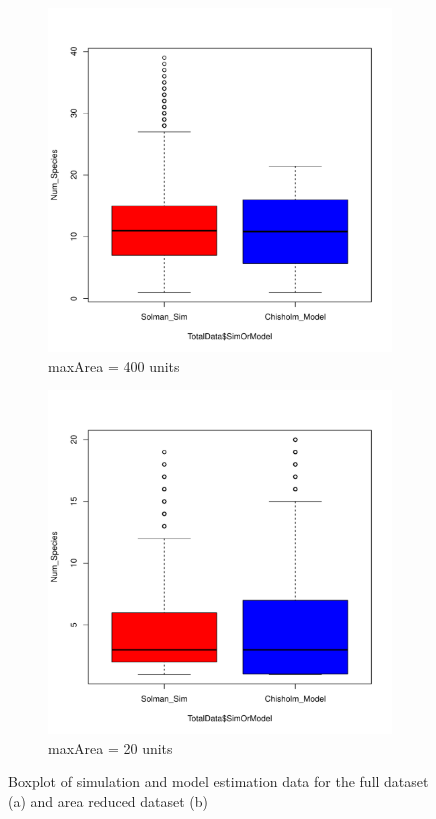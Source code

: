 \documentclass{article}
\begin{document}
\begin{figure}[h!]
  \centering
  \begin{subfigure}[b]{0.4\linewidth}
    \includegraphics[width=\linewidth]{../../Results/Simulation/SolmanChisholmBoxplot_1.pdf}
    \caption{maxArea = 400 units}
  \end{subfigure}
  \begin{subfigure}[b]{0.4\linewidth}
    \includegraphics[width=\linewidth]{../../Results/Simulation/SolmanChisholmBoxplot_20.pdf}
    \caption{maxArea = 20 units}
  \end{subfigure}
  \caption{Boxplot of simulation and model estimation data for the full dataset (a) and area reduced dataset (b)}
  \label{fig:boxplots}
\end{figure}
\end{document}
